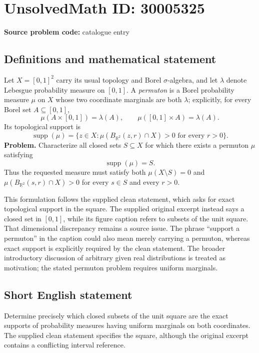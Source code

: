 \documentclass[11pt]{article}
\newcommand{\R}{\mathbb{R}}
\begin{document}
\section*{UnsolvedMath ID: 30005325}
\textbf{Source problem code:} catalogue entry
\subsection{Definitions and mathematical statement}
Let \(X=[0,1]^2\) carry its usual topology and Borel \(\sigma\)-algebra, and let \(\lambda\) denote Lebesgue probability measure on \([0,1]\). A \emph{permuton} is a Borel probability measure \(\mu\) on \(X\) whose two coordinate marginals are both \(\lambda\); explicitly, for every Borel set \(A\subseteq[0,1]\),
\[
\mu(A\times[0,1])=\lambda(A),\qquad
\mu([0,1]\times A)=\lambda(A).
\]
Its topological support is
\[
\operatorname{supp}(\mu)=\{z\in X:\mu(B_{\R^2}(z,r)\cap X)>0\text{ for every }r>0\}.
\]
\textbf{Problem.} Characterize all closed sets \(S\subseteq X\) for which there exists a permuton \(\mu\) satisfying
\[
\operatorname{supp}(\mu)=S.
\]
Thus the requested measure must satisfy both \(\mu(X\setminus S)=0\) and \(\mu(B_{\R^2}(s,r)\cap X)>0\) for every \(s\in S\) and every \(r>0\).

This formulation follows the supplied clean statement, which asks for exact topological support in the square. The supplied original excerpt instead says a closed set in \([0,1]\), while its figure caption refers to subsets of the unit square. That dimensional discrepancy remains a source issue. The phrase ``support a permuton'' in the caption could also mean merely carrying a permuton, whereas exact support is explicitly required by the clean statement. The broader introductory discussion of arbitrary given real distributions is treated as motivation; the stated permuton problem requires uniform marginals.
\subsection{Short English statement}
Determine precisely which closed subsets of the unit square are the exact supports of probability measures having uniform marginals on both coordinates. The supplied clean statement specifies the square, although the original excerpt contains a conflicting interval reference.
\end{document}
